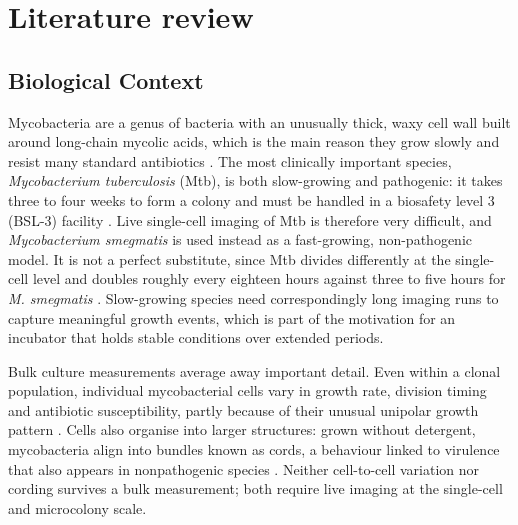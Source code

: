 
\chapter{Literature review}
\label{ch:review}

\section{Biological Context}
\label{sec:biological-context}

Mycobacteria are a genus of bacteria with an unusually thick, waxy cell wall built around long-chain mycolic acids, which is the main reason they grow slowly and resist many standard antibiotics \citep{brennan_structure_2003}. The most clinically important species, \textit{Mycobacterium tuberculosis} (Mtb), is both slow-growing and pathogenic: it takes three to four weeks to form a colony and must be handled in a biosafety level 3 (BSL-3) facility \citep{sparks_mycobacterium_nodate}. Live single-cell imaging of Mtb is therefore very difficult, and \textit{Mycobacterium smegmatis} is used instead as a fast-growing, non-pathogenic model. It is not a perfect substitute, since Mtb divides differently at the single-cell level and doubles roughly every eighteen hours against three to five hours for \textit{M. smegmatis} \citep{chung_single-cell_2024,sparks_mycobacterium_nodate}. Slow-growing species need correspondingly long imaging runs to capture meaningful growth events, which is part of the motivation for an incubator that holds stable conditions over extended periods.

Bulk culture measurements average away important detail. Even within a clonal population, individual mycobacterial cells vary in growth rate, division timing and antibiotic susceptibility, partly because of their unusual unipolar growth pattern \citep{davis_defining_2016,aldridge_asymmetry_2012}. Cells also organise into larger structures: grown without detergent, mycobacteria align into bundles known as cords, a behaviour linked to virulence that also appears in nonpathogenic species \citep{julian_microscopic_2010}. Neither cell-to-cell variation nor cording survives a bulk measurement; both require live imaging at the single-cell and microcolony scale.

